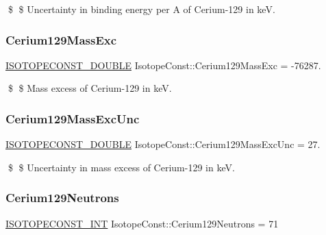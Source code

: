 \$ \$ Uncertainty in binding energy per A of Cerium-\/129 in keV. \mbox{\label{group___isotope_const-_cerium-_ce129_ga3a73e694f37c5bb8e4539a484dbf5592}} 
\subsubsection{\texorpdfstring{Cerium129\+Mass\+Exc}{Cerium129MassExc}}
{\footnotesize\ttfamily \mbox{\hyperlink{group___isotope_const-_macros_ga8f45a7272ce02c0b4c65c44636ed719a}{I\+S\+O\+T\+O\+P\+E\+C\+O\+N\+S\+T\+\_\+\+D\+O\+U\+B\+LE}} Isotope\+Const\+::\+Cerium129\+Mass\+Exc = -\/76287.}

\$ \$ Mass excess of Cerium-\/129 in keV. \mbox{\label{group___isotope_const-_cerium-_ce129_ga3bba9c481c338a48b342392562c689fa}} 
\subsubsection{\texorpdfstring{Cerium129\+Mass\+Exc\+Unc}{Cerium129MassExcUnc}}
{\footnotesize\ttfamily \mbox{\hyperlink{group___isotope_const-_macros_ga8f45a7272ce02c0b4c65c44636ed719a}{I\+S\+O\+T\+O\+P\+E\+C\+O\+N\+S\+T\+\_\+\+D\+O\+U\+B\+LE}} Isotope\+Const\+::\+Cerium129\+Mass\+Exc\+Unc = 27.}

\$ \$ Uncertainty in mass excess of Cerium-\/129 in keV. \mbox{\label{group___isotope_const-_cerium-_ce129_ga0bc7b1454dd5e71fe6939203cef299ac}} 
\subsubsection{\texorpdfstring{Cerium129\+Neutrons}{Cerium129Neutrons}}
{\footnotesize\ttfamily \mbox{\hyperlink{group___isotope_const-_macros_ga5f18360b3e99483a35c32d789e62621c}{I\+S\+O\+T\+O\+P\+E\+C\+O\+N\+S\+T\+\_\+\+I\+NT}} Isotope\+Const\+::\+Cerium129\+Neutrons = 71}

